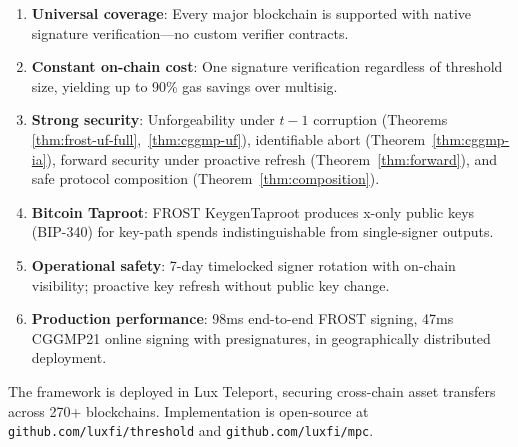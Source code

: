 \documentclass[11pt,twocolumn]{article}
\begin{document}
\begin{enumerate}[nosep]
  \item \textbf{Universal coverage}: Every major blockchain is supported with native
    signature verification---no custom verifier contracts.
  \item \textbf{Constant on-chain cost}: One signature verification regardless of
    threshold size, yielding up to 90\% gas savings over multisig.
  \item \textbf{Strong security}: Unforgeability under $t{-}1$ corruption (Theorems
    \ref{thm:frost-uf-full},~\ref{thm:cggmp-uf}), identifiable abort
    (Theorem~\ref{thm:cggmp-ia}), forward security under proactive refresh
    (Theorem~\ref{thm:forward}), and safe protocol composition
    (Theorem~\ref{thm:composition}).
  \item \textbf{Bitcoin Taproot}: FROST KeygenTaproot produces x-only public keys
    (BIP-340) for key-path spends indistinguishable from single-signer outputs.
  \item \textbf{Operational safety}: 7-day timelocked signer rotation with on-chain
    visibility; proactive key refresh without public key change.
  \item \textbf{Production performance}: 98ms end-to-end FROST signing, 47ms CGGMP21
    online signing with presignatures, in geographically distributed deployment.
\end{enumerate}

The framework is deployed in Lux Teleport, securing cross-chain asset transfers across
270+ blockchains. Implementation is open-source at \texttt{github.com/luxfi/threshold}
and \texttt{github.com/luxfi/mpc}.
\end{document}
